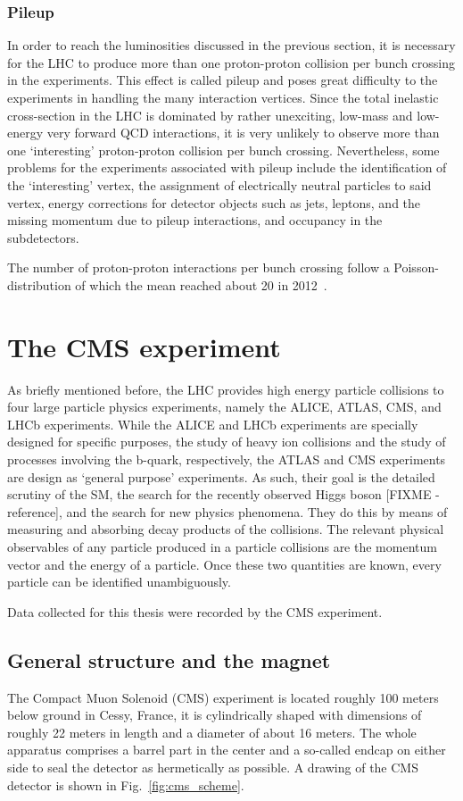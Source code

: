 \subsubsection*{Pileup}
In order to reach the luminosities discussed in the previous section, it is necessary for the LHC to produce more than
one proton-proton collision per bunch crossing in the experiments. This effect is called pileup and poses great difficulty
to the experiments in handling the many interaction vertices. Since the total inelastic cross-section in the LHC is dominated by
rather unexciting, low-mass and low-energy very forward QCD interactions, it is very unlikely to observe more than one `interesting' 
proton-proton collision per bunch crossing. Nevertheless, some problems for the experiments associated with pileup include the identification of the `interesting' 
vertex, the assignment of electrically neutral particles to said vertex, energy corrections for detector objects such as jets, leptons,
and the missing momentum due to pileup interactions, and occupancy in the subdetectors. 

The number of proton-proton interactions per bunch crossing follow a Poisson-distribution of which the mean reached about 20 in 2012~\cite{pileupCMS}.


\section{The CMS experiment}
\label{sec:cms}
As briefly mentioned before, the LHC provides high energy particle collisions to four large particle physics experiments, namely
the ALICE, ATLAS, CMS, and LHCb experiments. While the ALICE and LHCb experiments are specially designed for specific purposes,
the study of heavy ion collisions and the study of processes involving the b-quark, respectively, the ATLAS and CMS experiments
are design as `general purpose' experiments. As such, their goal is the detailed scrutiny of the SM, the search for the recently observed
Higgs boson [FIXME - reference], and the search for new physics phenomena. They do this by means of measuring and absorbing decay products
of the collisions. The relevant physical observables of any particle produced in a particle collisions are the momentum vector
and the energy of a particle. Once these two quantities are known, every particle can be identified unambiguously. 

Data collected for this thesis were recorded by the CMS experiment.

\subsection{General structure and the magnet}
\label{sub:cms_general}
The Compact Muon Solenoid (CMS) experiment is located roughly 100 meters below ground in Cessy, France,
it is cylindrically shaped with dimensions of roughly 22 meters in length and a diameter of about 16 meters. 
The whole apparatus comprises a barrel part in the center and a so-called endcap on either side to seal the detector as hermetically as possible.
A drawing of the CMS detector is shown in Fig.~\ref{fig:cms_scheme}. 

